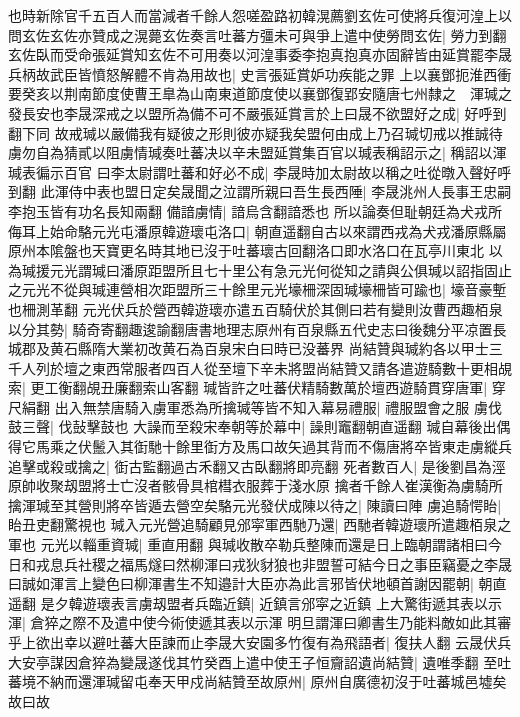 也時新除官千五百人而當減者千餘人怨嗟盈路初韓滉薦劉玄佐可使將兵復河湟上以問玄佐玄佐亦贊成之滉薨玄佐奏言吐蕃方彊未可與爭上遣中使勞問玄佐|{
	勞力到翻}
玄佐臥而受命張延賞知玄佐不可用奏以河湟事委李抱真抱真亦固辭皆由延賞罷李晟兵柄故武臣皆憤怒解體不肯為用故也|{
	史言張延賞妒功疾能之罪}
上以襄鄧扼淮西衝要癸亥以荆南節度使曹王臯為山南東道節度使以襄鄧復郢安隨唐七州隸之　渾瑊之發長安也李晟深戒之以盟所為備不可不嚴張延賞言於上曰晟不欲盟好之成|{
	好呼到翻下同}
故戒瑊以嚴備我有疑彼之形則彼亦疑我矣盟何由成上乃召瑊切戒以推誠待虜勿自為猜貳以阻虜情瑊奏吐蕃决以辛未盟延賞集百官以瑊表稱詔示之|{
	稱詔以渾瑊表徧示百官}
曰李太尉謂吐蕃和好必不成|{
	李晟時加太尉故以稱之吐從暾入聲好呼到翻}
此渾侍中表也盟日定矣晟聞之泣謂所親曰吾生長西陲|{
	李晟洮州人長事王忠嗣李抱玉皆有功名長知兩翻}
備諳虜情|{
	諳烏含翻諳悉也}
所以論奏但耻朝廷為犬戎所侮耳上始命駱元光屯潘原韓遊瓌屯洛口|{
	朝直遥翻自古以來謂西戎為犬戎潘原縣屬原州本隂盤也天寶更名時其地已沒于吐蕃瓌古回翻洛口即水洛口在瓦亭川東北}
以為瑊援元光謂瑊曰潘原距盟所且七十里公有急元光何從知之請與公俱瑊以詔指固止之元光不從與瑊連營相次距盟所三十餘里元光壕柵深固瑊壕柵皆可踰也|{
	壕音豪塹也柵測革翻}
元光伏兵於營西韓遊瓌亦遣五百騎伏於其側曰若有變則汝曹西趣栢泉以分其勢|{
	騎奇寄翻趣逡諭翻唐書地理志原州有百泉縣五代史志曰後魏分平凉置長城郡及黄石縣隋大業初改黄石為百泉宋白曰時已没蕃界}
尚結贊與瑊約各以甲士三千人列於壇之東西常服者四百人從至壇下辛未將盟尚結贊又請各遣遊騎數十更相覘索|{
	更工衡翻覘丑廉翻索山客翻}
瑊皆許之吐蕃伏精騎數萬於壇西遊騎貫穿唐軍|{
	穿尺絹翻}
出入無禁唐騎入虜軍悉為所擒瑊等皆不知入幕易禮服|{
	禮服盟會之服}
虜伐鼓三聲|{
	伐鼔擊鼓也}
大譟而至殺宋奉朝等於幕中|{
	譟則竈翻朝直遥翻}
瑊自幕後出偶得它馬乘之伏鬛入其衘馳十餘里衘方及馬口故矢過其背而不傷唐將卒皆東走虜縱兵追擊或殺或擒之|{
	衘古監翻過古禾翻又古臥翻將即亮翻}
死者數百人|{
	是後劉昌為涇原帥收聚刼盟將士亡沒者骸骨具棺槥衣服葬于淺水原}
擒者千餘人崔漢衡為虜騎所擒渾瑊至其營則將卒皆遁去營空矣駱元光發伏成陳以待之|{
	陳讀曰陣}
虜追騎愕眙|{
	眙丑吏翻驚視也}
瑊入元光營追騎顧見邠寜軍西馳乃還|{
	西馳者韓遊瓌所遣趣栢泉之軍也}
元光以輜重資瑊|{
	重直用翻}
與瑊收散卒勒兵整陳而還是日上臨朝謂諸相曰今日和戎息兵社稷之福馬燧曰然柳渾曰戎狄豺狼也非盟誓可結今日之事臣竊憂之李晟曰誠如渾言上變色曰柳渾書生不知邉計大臣亦為此言邪皆伏地頓首謝因罷朝|{
	朝直遥翻}
是夕韓遊瓌表言虜刼盟者兵臨近鎮|{
	近鎮言邠寜之近鎮}
上大驚街遞其表以示渾|{
	倉猝之際不及遣中使今術使遞其表以示渾}
明旦謂渾曰卿書生乃能料敵如此其審乎上欲出幸以避吐蕃大臣諫而止李晟大安園多竹復有為飛語者|{
	復扶人翻}
云晟伏兵大安亭謀因倉猝為變晟遂伐其竹癸酉上遣中使王子恒齎詔遺尚結贊|{
	遺唯季翻}
至吐蕃境不納而還渾瑊留屯奉天甲戍尚結贊至故原州|{
	原州自廣德初沒于吐蕃城邑墟矣故曰故}
